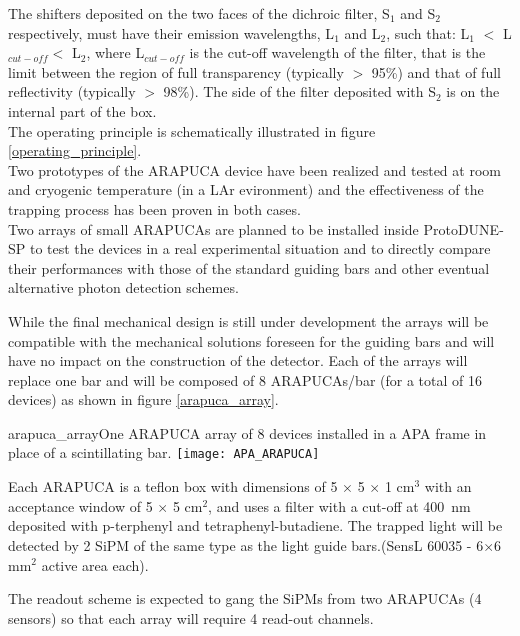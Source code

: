 The shifters deposited on the two faces of the dichroic filter, S$_1$ and S$_2$ respectively, must have their emission wavelengths, L$_1$ and L$_2$, such that:  
L$_1$ $<$ L$_{cut-off}$$ <$ L$_2$, where L$_{cut-off}$ is the cut-off wavelength of the filter, that is the limit between the region of full transparency (typically $>$ 95\%) and that of full
 reflectivity (typically $>$ 98\%). The side of the filter deposited with S$_2$ is on the internal part of the box.\\
 The operating principle is schematically illustrated in figure \ref{operating_principle}.\\
 
 Two prototypes of the ARAPUCA device have been realized and tested at room and cryogenic temperature (in a LAr evironment) and the effectiveness of the trapping process has been 
 proven in both cases.\\

Two arrays of small ARAPUCAs are planned to be installed inside ProtoDUNE-SP to test the devices in a real experimental situation and to directly compare their performances with those of the standard guiding bars and other eventual alternative photon detection schemes.\

While the final mechanical design is still under development the arrays will be compatible with the mechanical solutions foreseen for the guiding bars and will have no impact on the construction of the detector. Each of the arrays will replace one bar and will be composed of 8 ARAPUCAs/bar (for a total of 16 devices)  as shown in figure \ref{arapuca_array}.
\begin{cdrfigure}{arapuca_array}{One ARAPUCA array of 8 devices installed in a APA frame in place of a scintillating bar.}
\texttt{[image: APA\_ARAPUCA]}
\end{cdrfigure}

Each ARAPUCA is a teflon box with dimensions of 5 $\times$ 5 $\times$ 1 cm$^3$ with an acceptance window of 5 $\times$ 5 
cm$^2$, and uses a filter with a cut-off at 400~nm deposited with p-terphenyl and tetraphenyl-butadiene. The trapped light will be detected by 2 SiPM of the same type as the light guide bars.(SensL 60035 - 6$\times$6 mm$^2$ 
active area each).

The readout scheme is expected to gang the SiPMs from two ARAPUCAs (4 sensors) so that each array will require 4 read-out channels. 

